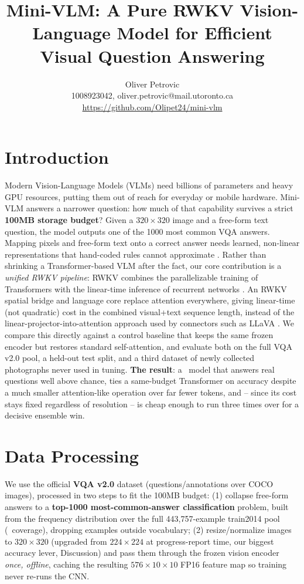 \documentclass[final]{article}
\title{Mini-VLM: A Pure RWKV Vision-Language Model for Efficient Visual Question Answering}
\author{%
  Oliver Petrovic \\
  1008923042, oliver.petrovic@mail.utoronto.ca\\
  \url{https://github.com/Olipet24/mini-vlm}\\
}
\begin{document}
\maketitle

\vspace{-0.68in}

\section*{Introduction}

Modern Vision-Language Models (VLMs) need billions of parameters and heavy GPU resources, putting
them out of reach for everyday or mobile hardware. Mini-VLM answers a narrower question: how much
of that capability survives a strict \textbf{100MB storage budget}? Given a
$320\times320$ image and a free-form text question, the model
outputs one of the 1000 most common VQA answers. Mapping pixels and free-form text onto a correct
answer needs learned, non-linear representations that hand-coded rules cannot approximate
\cite{goyal2017making}. Rather than shrinking a Transformer-based VLM after the fact, our core
contribution is a \emph{unified RWKV pipeline}: RWKV combines the parallelizable training of
Transformers with the linear-time inference of recurrent networks \cite{peng2023rwkv}. An RWKV
spatial bridge and language core replace attention everywhere, giving linear-time (not quadratic)
cost in the combined visual+text sequence length, instead of the linear-projector-into-attention
approach used by connectors such as LLaVA \cite{liu2023visual}. We compare this directly against a
control baseline that keeps the same frozen encoder but restores standard self-attention, and
evaluate both on the full VQA v2.0 pool, a held-out test split, and a third dataset of newly
collected photographs never used in tuning. \textbf{The result}: a \primaryTotalSize\ model that
answers real questions well above chance, ties a same-budget Transformer on accuracy despite a
much smaller attention-like operation over far fewer tokens, and -- since its cost stays fixed
regardless of resolution -- is cheap enough to run three times over for a decisive ensemble win.

\section*{Data Processing}

We use the official \textbf{VQA v2.0} dataset (questions/annotations over COCO images), processed
in two steps to fit the 100MB budget: (1) collapse free-form answers to a \textbf{top-1000
most-common-answer classification} problem, built from the frequency distribution over the full
443{,}757-example train2014 pool (\vocabCoverage\ coverage), dropping examples outside vocabulary;
(2) resize/normalize images to $320\times320$ (upgraded from $224\times224$ at progress-report
time, our biggest accuracy lever, Discussion) and pass them through the frozen vision encoder
\emph{once, offline}, caching the resulting $576\times10\times10$ FP16 feature map so training
never re-runs the CNN.
\end{document}
